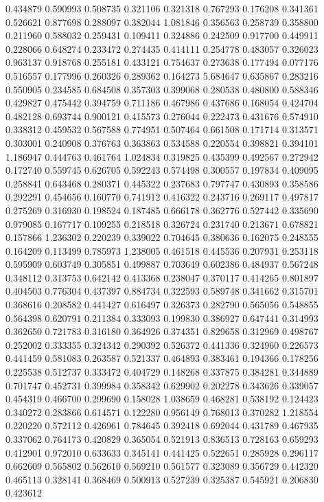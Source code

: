 0.434879
0.590993
0.508735
0.321106
0.321318
0.767293
0.176208
0.341361
0.526621
0.877698
0.288097
0.382044
1.081846
0.356563
0.258739
0.358800
0.211960
0.588032
0.259431
0.109411
0.324886
0.242509
0.917700
0.449911
0.228066
0.648274
0.233472
0.274435
0.414111
0.254778
0.483057
0.326023
0.963137
0.918768
0.255181
0.433121
0.754637
0.273638
0.177494
0.077176
0.516557
0.177996
0.260326
0.289362
0.164273
5.684647
0.635867
0.283216
0.550905
0.234585
0.684508
0.357303
0.399068
0.280538
0.480800
0.588346
0.429827
0.475442
0.394759
0.711186
0.467986
0.437686
0.168054
0.424704
0.482128
0.693744
0.900121
0.415573
0.276044
0.222473
0.431676
0.574910
0.338312
0.459532
0.567588
0.774951
0.507464
0.661508
0.171714
0.313571
0.303001
0.240908
0.376763
0.363863
0.534588
0.220554
0.398821
0.394101
1.186947
0.444763
0.461764
1.024834
0.319825
0.435399
0.492567
0.272942
0.172740
0.559745
0.626705
0.592243
0.574498
0.300557
0.197834
0.409095
0.258841
0.643468
0.280371
0.445322
0.237683
0.797747
0.430893
0.358586
0.292291
0.454656
0.160770
0.741912
0.416322
0.243716
0.269117
0.497817
0.275269
0.316930
0.198524
0.187485
0.666178
0.362776
0.527442
0.335690
0.979085
0.167717
0.109255
0.218518
0.326724
0.231740
0.213671
0.678821
0.157866
1.236302
0.220239
0.339022
0.704645
0.380636
0.162075
0.248555
0.164209
0.113499
0.785973
1.238005
0.461518
0.445536
0.207931
0.253118
0.595909
0.603749
0.305851
0.499887
0.703649
0.602386
0.484937
0.567248
0.348112
0.313753
0.642142
0.413368
0.238047
0.370117
0.414265
0.801897
0.404503
0.776304
0.437397
0.884734
0.322593
0.589748
0.341662
0.315701
0.368616
0.208582
0.441427
0.616497
0.326373
0.282790
0.565056
0.548855
0.564398
0.620791
0.211384
0.333093
0.199830
0.386927
0.647441
0.314993
0.362650
0.721783
0.316180
0.364926
0.374351
0.829658
0.312969
0.498767
0.252002
0.333355
0.324342
0.290392
0.526372
0.441336
0.324960
0.226573
0.441459
0.581083
0.263587
0.521337
0.464893
0.383461
0.194366
0.178256
0.225538
0.512737
0.333472
0.404729
0.148268
0.337875
0.384281
0.344889
0.701747
0.452731
0.399984
0.358342
0.629902
0.202278
0.343626
0.339057
0.454319
0.466700
0.299690
0.158028
1.038659
0.468281
0.538192
0.124423
0.340272
0.283866
0.614571
0.122280
0.956149
0.768013
0.370282
1.218554
0.220220
0.572112
0.426961
0.784645
0.392418
0.692044
0.431789
0.467935
0.337062
0.764173
0.420829
0.365054
0.521913
0.836513
0.728163
0.659293
0.412901
0.972010
0.633633
0.345141
0.441425
0.522651
0.285928
0.296117
0.662609
0.565802
0.562610
0.569210
0.561577
0.323089
0.356729
0.442320
0.465113
0.328141
0.368469
0.500913
0.527239
0.325387
0.545921
0.206830
0.423612
